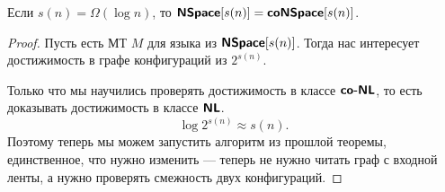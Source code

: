 \begin{cor}
	Если $ s(n) = \Omega (\log n)$, то $ \textmd{\textbf{\textsf{NSpace}}}[s(n)] = \textmd{\textbf{\textsf{coNSpace}}}[s(n)]$.
\end{cor}
\begin{proof}
	Пусть есть МТ $ M$ для языка из $ \textmd{\textbf{\textsf{NSpace}}}[s(n)]$. Тогда нас интересует достижимость в графе конфигураций из $ 2^{s(n)}$.

	Только что мы научились проверять достижимость в классе $ \textmd{\textbf{\textsf{co-NL}}}$, то есть доказывать достижимость в классе $ \textmd{\textbf{\textsf{NL}}} $.
	\[
		\log 2^{s(n)} \approx s(n)
	.\] 
	Поэтому теперь мы можем запустить алгоритм из прошлой теоремы, единственное, что нужно изменить --- теперь не нужно читать граф с входной ленты, а нужно проверять смежность двух конфигураций.
\end{proof}
